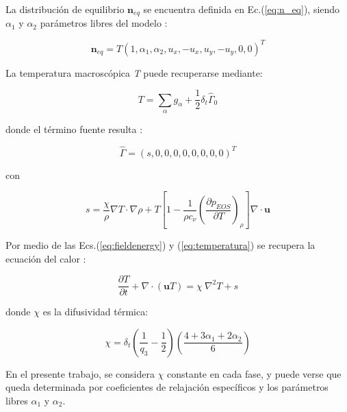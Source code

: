 La distribución de equilibrio $\mathbf{n}_{eq}$ se encuentra definida en Ec.(\ref{eq:n_eq}), siendo $\alpha_{1}$ y $\alpha_{2}$ parámetros libres del modelo :

\begin{equation}
    {\mathbf{n}}_{eq} = T { \left( 1, \alpha_{1}, \alpha_{2}, u_{x}, -u_{x}, u_{y}, -u_{y}, 0, 0 \right) }^{T}
    \label{eq:n_eq}
\end{equation}

La temperatura macroscópica \textit{T} puede recuperarse mediante:

\begin{equation}
T = \sum_{\alpha} g_{\alpha} + \frac{1}{2} \delta_{t} {\hat{\Gamma}}_{0}
\label{eq:temperatura}
\end{equation}



donde el término fuente resulta :


\begin{equation}
    \hat{\Gamma} = {( s, 0, 0, 0, 0, 0, 0, 0, 0 )}^{T}
\end{equation}

con 

\begin{equation}
    s = \frac{\chi}{\rho} \nabla T \cdot \nabla \rho + T \left[ 1 - \frac{1}{\rho c_{\nu}} {\left( \frac{\partial p_{EOS}}{\partial T} \right)}_{\rho} \right] \nabla \cdot \mathbf{u}
    \label{eq:s_chica}
\end{equation}

Por medio de las  Ecs.(\ref{eq:fieldenergy}) y (\ref{eq:temperatura}) se recupera la ecuación del calor \cite{markus2011simulation}:

\begin{equation}
    \frac{\partial T}{\partial t} + \nabla \cdot ( \mathbf{u} T ) = \chi \> {\nabla }^{2} T + s
    \label{eq:calor_ecu}
\end{equation}

donde $\chi$ es la difusividad térmica:

\begin{equation}
\chi = \delta_{t} \left( \frac{1}{q_{3}} - \frac{1}{2} \right) \left( \frac{ 4 + 3 \alpha_{1} + 2 \alpha_{2}}{6} \right)
\label{eq:chi}
\end{equation}

En el presente trabajo, se considera $\chi$ constante en cada fase, y puede verse que queda determinada por coeficientes de relajación específicos y los parámetros libres $\alpha_{1}$ y $\alpha_{2}$.



